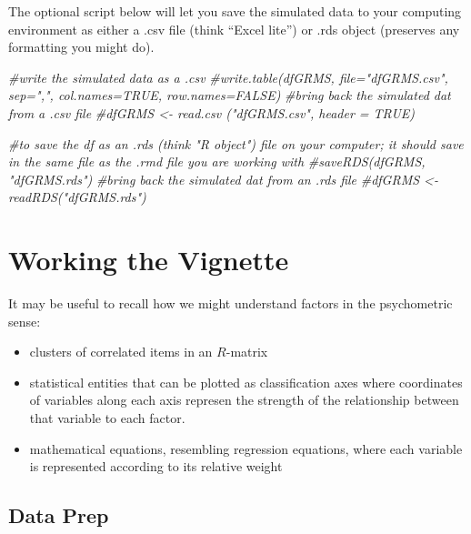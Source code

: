 \documentclass[
  english,
]{book}
\newenvironment{Shaded}{\begin{snugshade}}{\end{snugshade}}
\newcommand{\CommentTok}[1]{\textcolor[rgb]{0.56,0.35,0.01}{\textit{#1}}}
\providecommand{\tightlist}{%
  \setlength{\itemsep}{0pt}\setlength{\parskip}{0pt}}
\begin{document}
The optional script below will let you save the simulated data to your computing environment as either a .csv file (think ``Excel lite'') or .rds object (preserves any formatting you might do).

\begin{Shaded}
\begin{Highlighting}[]
\CommentTok{#write the simulated data  as a .csv}
\CommentTok{#write.table(dfGRMS, file="dfGRMS.csv", sep=",", col.names=TRUE, row.names=FALSE)}
\CommentTok{#bring back the simulated dat from a .csv file}
\CommentTok{#dfGRMS <- read.csv ("dfGRMS.csv", header = TRUE)}
\end{Highlighting}
\end{Shaded}

\begin{Shaded}
\begin{Highlighting}[]
\CommentTok{#to save the df as an .rds (think "R object") file on your computer; it should save in the same file as the .rmd file you are working with}
\CommentTok{#saveRDS(dfGRMS, "dfGRMS.rds")}
\CommentTok{#bring back the simulated dat from an .rds file}
\CommentTok{#dfGRMS <- readRDS("dfGRMS.rds")}
\end{Highlighting}
\end{Shaded}

\hypertarget{working-the-vignette-1}{%
\section{Working the Vignette}\label{working-the-vignette-1}}

It may be useful to recall how we might understand factors in the psychometric sense:

\begin{itemize}
\tightlist
\item
  clusters of correlated items in an \(R\)-matrix
\item
  statistical entities that can be plotted as classification axes where coordinates of variables along each axis represen the strength of the relationship between that variable to each factor.
\item
  mathematical equations, resembling regression equations, where each variable is represented according to its relative weight
\end{itemize}

\hypertarget{data-prep-1}{%
\subsection{Data Prep}\label{data-prep-1}}
\end{document}
